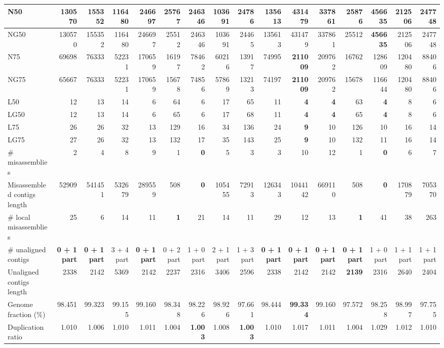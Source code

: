 \documentclass[12pt,a4paper]{article}
\begin{document}
\begin{table}[ht]
\begin{center}
\begin{tabular}{|l*{15}{|r}|}
N50 & 130570 & 155352 & 116480 & 246697 & 25767 & 246346 & 103691 & 24786 & 135613 & 431479 & 337861 & 25876 & {\bf 456635} & 212506 & 247748 \\ \hline
NG50 & 130570 & 155352 & 116480 & 246697 & 25512 & 246346 & 103691 & 24465 & 135613 & 431479 & 337861 & 25512 & {\bf 456635} & 212506 & 247748 \\ \hline
N75 & 69698 & 76333 & 52231 & 170659 & 16197 & 78462 & 60216 & 13917 & 74995 & {\bf 211009} & 209762 & 16762 & 128609 & 120480 & 88406 \\ \hline
NG75 & 65667 & 76333 & 52231 & 170659 & 15678 & 74856 & 57869 & 13213 & 74197 & {\bf 211009} & 209762 & 15678 & 116644 & 120480 & 88406 \\ \hline
L50 & 12 & 13 & 14 & 6 & 64 & 6 & 17 & 65 & 11 & {\bf 4} & {\bf 4} & 63 & {\bf 4} & 8 & 6 \\ \hline
LG50 & 12 & 13 & 14 & 6 & 65 & 6 & 17 & 68 & 11 & {\bf 4} & {\bf 4} & 65 & {\bf 4} & 8 & 6 \\ \hline
L75 & 26 & 26 & 32 & 13 & 129 & 16 & 34 & 136 & 24 & {\bf 9} & 10 & 126 & 10 & 16 & 14 \\ \hline
LG75 & 27 & 26 & 32 & 13 & 132 & 17 & 35 & 143 & 25 & {\bf 9} & 10 & 132 & 11 & 16 & 14 \\ \hline
\# misassemblies & 2 & 4 & 8 & 9 & 1 & {\bf 0} & 5 & 3 & 3 & 10 & 12 & 1 & {\bf 0} & 6 & 7 \\ \hline
Misassembled contigs length & 52909 & 541451 & 532679 & 289559 & 508 & {\bf 0} & 105455 & 72913 & 126343 & 1044142 & 669110 & 508 & {\bf 0} & 170879 & 705370 \\ \hline
\# local misassemblies & 25 & 6 & 14 & 11 & {\bf 1} & 21 & 14 & 11 & 29 & 12 & 13 & {\bf 1} & 41 & 38 & 263 \\ \hline
\# unaligned contigs & {\bf 0 + 1 part} & {\bf 0 + 1 part} & 3 + 4 part & {\bf 0 + 1 part} & 0 + 2 part & 1 + 0 part & 2 + 1 part & 1 + 3 part & {\bf 0 + 1 part} & {\bf 0 + 1 part} & {\bf 0 + 1 part} & {\bf 0 + 1 part} & 1 + 0 part & 1 + 1 part & 1 + 1 part \\ \hline
Unaligned contigs length & 2338 & 2142 & 5369 & 2142 & 2237 & 2316 & 3406 & 2596 & 2338 & 2142 & 2142 & {\bf 2139} & 2316 & 2640 & 2404 \\ \hline
Genome fraction (\%) & 98.451 & 99.323 & 99.155 & 99.160 & 98.348 & 98.226 & 98.926 & 97.661 & 98.444 & {\bf 99.334} & 99.160 & 97.572 & 98.258 & 98.997 & 97.755 \\ \hline
Duplication ratio & 1.010 & 1.006 & 1.010 & 1.011 & 1.004 & {\bf 1.003} & 1.008 & {\bf 1.003} & 1.010 & 1.017 & 1.011 & 1.004 & 1.029 & 1.012 & 1.010 \\ \hline

\end{tabular}
\end{center}
\end{table}
\end{document}
